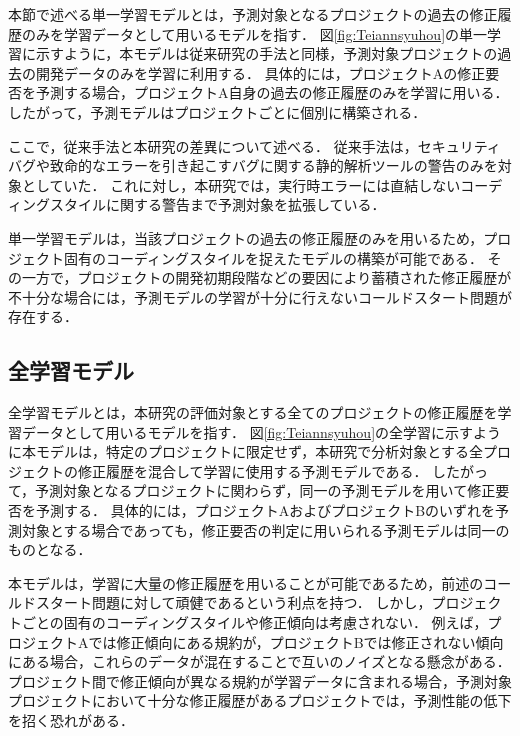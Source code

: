 \documentclass[11pt]{jreport}
\begin{document}
本節で述べる単一学習モデルとは，予測対象となるプロジェクトの過去の修正履歴のみを学習データとして用いるモデルを指す\cite{JyuraiPre}．
図\ref{fig:Teiannsyuhou}の単一学習に示すように，本モデルは従来研究の手法と同様，予測対象プロジェクトの過去の開発データのみを学習に利用する．
具体的には，プロジェクトAの修正要否を予測する場合，プロジェクトA自身の過去の修正履歴のみを学習に用いる．
したがって，予測モデルはプロジェクトごとに個別に構築される．

ここで，従来手法と本研究の差異について述べる．
従来手法は，セキュリティバグや致命的なエラーを引き起こすバグに関する静的解析ツールの警告のみを対象としていた．
これに対し，本研究では，実行時エラーには直結しないコーディングスタイルに関する警告まで予測対象を拡張している．

単一学習モデルは，当該プロジェクトの過去の修正履歴のみを用いるため，プロジェクト固有のコーディングスタイルを捉えたモデルの構築が可能である．
その一方で，プロジェクトの開発初期段階などの要因により蓄積された修正履歴が不十分な場合には，予測モデルの学習が十分に行えないコールドスタート問題が存在する．


\subsection{全学習モデル}


全学習モデルとは，本研究の評価対象とする全てのプロジェクトの修正履歴を学習データとして用いるモデルを指す．
図\ref{fig:Teiannsyuhou}の全学習に示すように本モデルは，特定のプロジェクトに限定せず，本研究で分析対象とする全プロジェクトの修正履歴を混合して学習に使用する予測モデルである．
したがって，予測対象となるプロジェクトに関わらず，同一の予測モデルを用いて修正要否を予測する．
具体的には，プロジェクトAおよびプロジェクトBのいずれを予測対象とする場合であっても，修正要否の判定に用いられる予測モデルは同一のものとなる．

本モデルは，学習に大量の修正履歴を用いることが可能であるため，前述のコールドスタート問題に対して頑健であるという利点を持つ．
しかし，プロジェクトごとの固有のコーディングスタイルや修正傾向は考慮されない．
例えば，プロジェクトAでは修正傾向にある規約が，プロジェクトBでは修正されない傾向にある場合，これらのデータが混在することで互いのノイズとなる懸念がある．
プロジェクト間で修正傾向が異なる規約が学習データに含まれる場合，予測対象プロジェクトにおいて十分な修正履歴があるプロジェクトでは，予測性能の低下を招く恐れがある．
\end{document}
